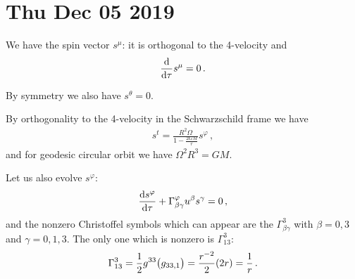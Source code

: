 \documentclass[main.tex]{subfiles}
\begin{document}
\section*{Thu Dec 05 2019}

We have the spin vector \(s^{\mu }\): it is orthogonal to the 4-velocity and 
%
\begin{align}
  \dv{}{\tau } s^{\mu } = 0
\,.
\end{align}

By symmetry we also have \(s^{\theta } =0\). 

By orthogonality to the 4-velocity in the Schwarzschild frame we have 
%
\begin{align}
  s^{t} = \frac{R^2 \Omega }{1 - \frac{2GM}{r}} s^{\varphi }
\,,
\end{align}
%
and for geodesic circular orbit we have \(\Omega^2 R^3 = GM \). 

Let us also evolve \(s^{\varphi }\): 
%
\begin{align}
  \dv{s^{\varphi }}{\tau } + \Gamma^{\varphi }_{\beta \gamma } u^{\beta  } s^{\gamma } = 0
\,,
\end{align}
%
and the nonzero Christoffel symbols which can appear are the \(\Gamma^{3}_{\beta \gamma }\) with \(\beta = 0, 3\) and \(\gamma = 0, 1, 3\). 
The only one which is nonzero is \(\Gamma^{3}_{13}\): 
%
\begin{align}
  \Gamma^{3}_{13} = \frac{1}{2} g^{33} \qty(g_{33, 1})
 = \frac{r^{-2}}{2} \qty(2r) = \frac{1}{r} 
\,.
\end{align}
\end{document}
